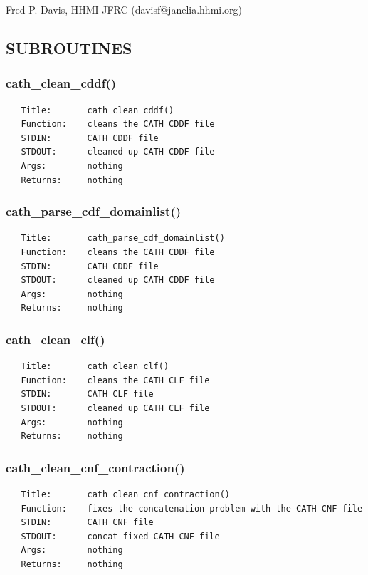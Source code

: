\documentclass{article}
\begin{document}
Fred P. Davis, HHMI-JFRC (davisf@janelia.hhmi.org)

\subsection*{SUBROUTINES\label{pibase::CATH_SUBROUTINES}}
\subsubsection*{cath\_clean\_cddf()\label{pibase::CATH_cath_clean_cddf_}}
\begin{verbatim}
   Title:       cath_clean_cddf()
   Function:    cleans the CATH CDDF file
   STDIN:       CATH CDDF file
   STDOUT:      cleaned up CATH CDDF file
   Args:        nothing
   Returns:     nothing
\end{verbatim}
\subsubsection*{cath\_parse\_cdf\_domainlist()\label{pibase::CATH_cath_parse_cdf_domainlist_}}
\begin{verbatim}
   Title:       cath_parse_cdf_domainlist()
   Function:    cleans the CATH CDDF file
   STDIN:       CATH CDDF file
   STDOUT:      cleaned up CATH CDDF file
   Args:        nothing
   Returns:     nothing
\end{verbatim}
\subsubsection*{cath\_clean\_clf()\label{pibase::CATH_cath_clean_clf_}}
\begin{verbatim}
   Title:       cath_clean_clf()
   Function:    cleans the CATH CLF file
   STDIN:       CATH CLF file
   STDOUT:      cleaned up CATH CLF file
   Args:        nothing
   Returns:     nothing
\end{verbatim}
\subsubsection*{cath\_clean\_cnf\_contraction()\label{pibase::CATH_cath_clean_cnf_contraction_}}
\begin{verbatim}
   Title:       cath_clean_cnf_contraction()
   Function:    fixes the concatenation problem with the CATH CNF file
   STDIN:       CATH CNF file
   STDOUT:      concat-fixed CATH CNF file
   Args:        nothing
   Returns:     nothing
\end{verbatim}
\end{document}
